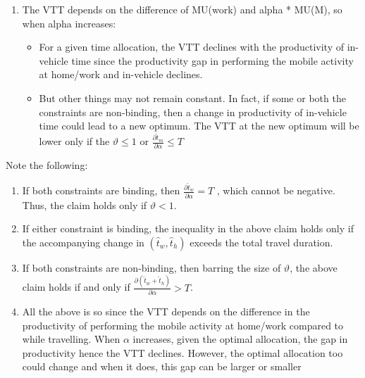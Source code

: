 \documentclass[12pt,a4paper,british]{article}
\begin{document}
{\color{red}
\begin{enumerate}
    \item The VTT depends on the difference of MU(work) and alpha * MU(M), so when alpha increases:
    \begin{itemize}
        \item For a given time allocation, the VTT declines with the productivity of in-vehicle time since the productivity gap in performing the mobile activity at home/work and in-vehicle declines.
        \item But other things may not remain constant. In fact, if some or both the constraints are non-binding, then a change in productivity of in-vehicle time could lead to a new optimum. The VTT at the new optimum will be lower only if the $\vartheta \leq 1$ or $\frac{\partial \hat{t}_{m}}{\partial \alpha} \leq T$
    \end{itemize}
\end{enumerate}
}

Note the following:
\begin{enumerate}
\item If both constraints are binding, then $\frac{\partial\hat{t}_{w}}{\partial\alpha} = T$ , which cannot be negative. Thus, the claim holds only if $\vartheta < 1$.
\item If either constraint is binding, the inequality in the above claim holds only if the accompanying change in $\left(\hat{t}_w,\hat{t}_h\right)$ exceeds the total travel duration.
\item If both constraints are non-binding, then barring the size of $\vartheta$, the above claim holds if and only if $\frac{\partial \left(\hat{t}_w + \hat{t}_h \right)} {\partial\alpha} > T$. 
\item All the above is so since the VTT depends on the difference in the productivity of performing the mobile activity at home/work compared to while travelling. When $\alpha$ increases, given the optimal allocation, the gap in productivity hence the VTT declines. However, the optimal allocation too could change and when it does, this   gap can be larger or smaller 
\end{enumerate}
\end{document}
